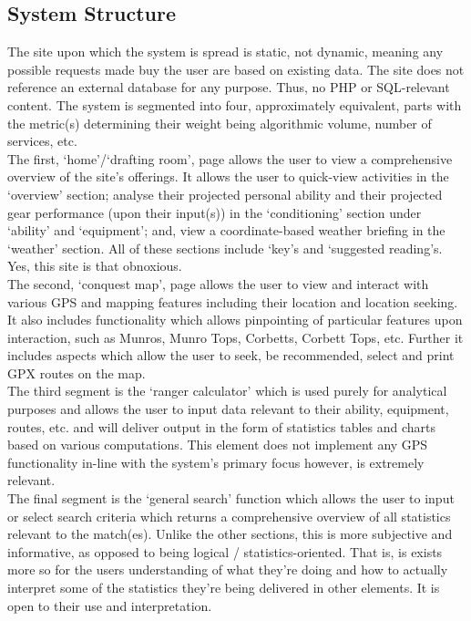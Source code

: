 \documentclass[11pt, english]{article}
\begin{document}
	\subsection{System Structure}

	The site upon which the system is spread is static, not dynamic, meaning any possible requests made buy the user are based on existing data. The site does not reference an external database for any purpose. Thus, no PHP or SQL-relevant content. The system is segmented into four, approximately equivalent, parts with the metric(s) determining their weight being algorithmic volume, number of services, etc.\\

	The first, `home'/`drafting room', page allows the user to view a comprehensive overview of the site's offerings. It allows the user to quick-view activities in the `overview' section; analyse their projected personal ability and their projected gear performance (upon their input(s)) in the `conditioning' section under `ability' and `equipment'; and, view a coordinate-based weather briefing in the `weather' section. All of these sections include `key's and `suggested reading's. Yes, this site is that obnoxious.\\

	The second, `conquest map', page allows the user to view and interact with various GPS and mapping features including their location and location seeking. It also includes functionality which allows pinpointing of particular features upon interaction, such as Munros, Munro Tops, Corbetts, Corbett Tops, etc. Further it includes aspects which allow the user to seek, be recommended, select and print GPX routes on the map.\\

	The third segment is the `ranger calculator' which is used purely for analytical purposes and allows the user to input data relevant to their ability, equipment, routes, etc. and will deliver output in the form of statistics tables and charts based on various computations. This element does not implement any GPS functionality in-line with the system's primary focus however, is extremely relevant.\\

	The final segment is the `general search' function which allows the user to input or select search criteria which returns a comprehensive overview of all statistics relevant to the match(es). Unlike the other sections, this is more subjective and informative, as opposed to being logical / statistics-oriented. That is, is exists more so for the users understanding of what they're doing and how to actually interpret some of the statistics they're being delivered in other elements. It is open to their use and interpretation.\\
\end{document}
